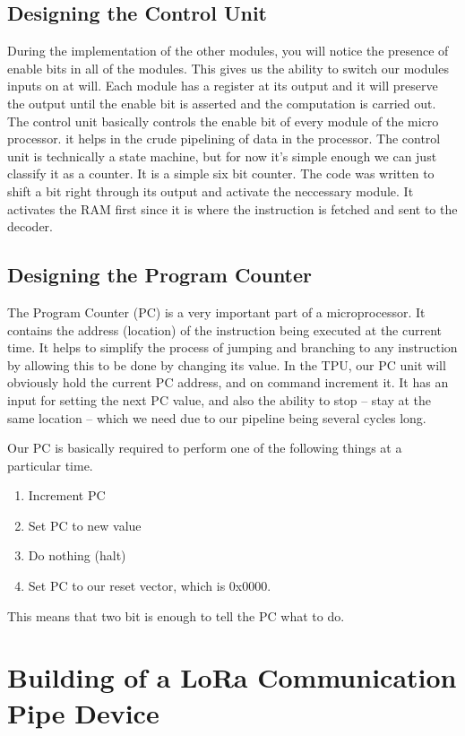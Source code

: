 \subsection{Designing the Control Unit}
During the implementation of the other modules, you will notice the presence of enable bits in all of the modules. This gives us the ability to switch our modules inputs on at will. Each module has a register at its output and it will preserve the output until the enable bit is asserted and the computation is carried out.  
The control unit basically controls the enable bit of every module of the micro processor. it helps in the crude pipelining of data in the processor. 
The control unit is technically a state machine, but for now it’s simple enough we can just classify it as a counter. It is a simple six bit counter. The code was written to shift a bit right through its output and activate the neccessary module. It activates the RAM first since it is where the instruction is fetched and sent to the decoder.


\subsection{Designing the Program Counter}
The Program Counter (PC) is a very important part of a microprocessor. It contains the address (location) of the instruction being executed at the current time.  It helps to simplify the process of jumping and branching to any instruction by allowing this to be done by changing its value.
In the TPU, our PC unit will obviously hold the current PC address, and on command increment it. It has an input for setting the next PC value, and also the ability to stop – stay at the same location – which we need due to our pipeline being several cycles long.

Our PC is basically required to perform one of the following things at a particular time.
\begin{enumerate}
\item Increment PC
\item Set PC to new value
\item Do nothing (halt)
\item Set PC to our reset vector, which is 0x0000.
\end{enumerate}

This means that two bit is enough to tell the PC what to do. 


\section{Building of a LoRa Communication Pipe Device} 



